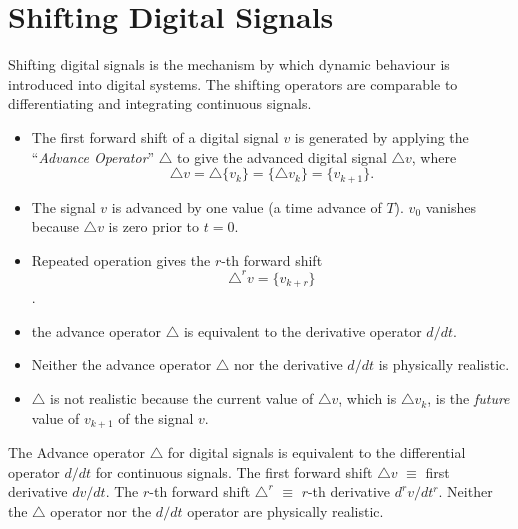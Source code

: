 \section*{Shifting Digital Signals}
Shifting digital signals is the mechanism by which dynamic
behaviour is introduced into digital systems. The shifting
operators are comparable to differentiating and integrating
continuous signals.

\begin{slide}
  \label{slide:l7s4}
\begin{itemize}

\item   The first forward shift of a digital signal $v$ is generated by
  applying the ``\emph{Advance Operator}'' $\triangle$  to give the
  advanced digital signal $\triangle v$, where \[ \triangle v = \triangle
  \{v_k\} = \{\triangle v_k\} = \{v_{k+1}\}.\]
  

\item   The signal $v$ is advanced by one value (a time advance of
  $T$). $v_0$ vanishes because $\triangle v$ is zero prior to $t=0$.


\item   Repeated operation gives the $r$-th forward shift \[
  \triangle^r v = \{v_{k+r}\}\].

\end{itemize}

\end{slide}

\begin{slide}
\label{slide:l7s4a}

\begin{itemize}

\item the advance operator $\triangle$ is equivalent to the derivative operator
  $d/dt$.

\item   Neither the advance operator $\triangle$ nor the derivative
  $d/dt$ is physically realistic. 

\item $\triangle$ is not realistic because
  the current value of $\triangle v$, which is $\triangle v_k$,
  is the \emph{future} value of $v_{k+1}$ of the signal $v$. 

\end{itemize}
\end{slide}

The Advance operator $\triangle$ for digital signals is equivalent to the
differential operator $d/dt$ for continuous signals. The first forward
shift $\triangle v$ $\equiv$ first derivative $dv/dt$. The $r$-th
forward shift $\triangle^r$ $\equiv$ $r$-th derivative $d^rv/dt^r$. Neither the $\triangle$ operator nor the $d/dt$ operator are
physically realistic.

